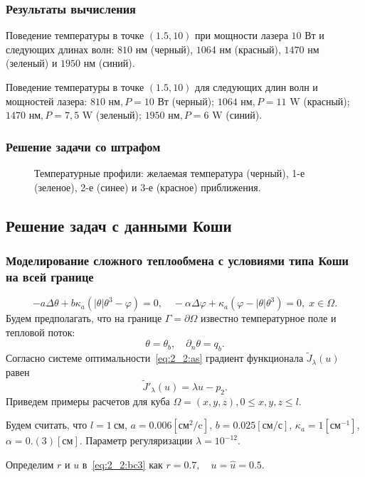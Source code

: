 \begin{frame}
    \frametitle{Результаты вычисления}
    \begin{minipage}[t]{0.47\linewidth}
        \small{Поведение температуры в точке $(1.5,10)$
            при мощности лазера $10\text{~Вт}$ и следующих длинах волн:
            $810\text{~нм}$ (черный), $1064\text{~нм}$ (красный),
            $1470\text{~нм}$ (зеленый) и $1950\text{~нм}$ (синий).}
    \end{minipage}
    \hfill
    \begin{minipage}[t]{0.47\linewidth}
        \small{Поведение температуры в точке $(1.5,10)$
            для следующих длин волн и мощностей лазера:
            $810 \text{~нм}, P=10 \text{~Вт}$ (черный);
            $1064 \text{~нм}, P=11 \text{~W}$ (красный);
            $1470 \text{~нм}, P=7,5 \text{~W}$ (зеленый);
            $1950 \text{~нм}, P=6 \text{~W}$ (синий).}
    \end{minipage}
\end{frame}

\begin{frame}
    \frametitle{Решение задачи со штрафом}
    \begin{figure}[h!t]
        \caption{Температурные профили: желаемая температура (черный),
            1-е (зеленое), 2-е (синее) и 3-е (красное) приближения.}
        \label{fig:4_3:7}
    \end{figure}
\end{frame}

\subsection{Решение задач с данными Коши}\label{subsec:koshi}
\begin{frame}
    \frametitle{Моделирование сложного теплообмена
    с условиями типа Коши на всей границе}
    \[
        - a\Delta\theta + b\kappa_a(|\theta|\theta^3- \varphi)=0,
        \quad -\alpha \Delta \varphi
        + \kappa_a(\varphi-|\theta|\theta^3)=0,\; x\in\Omega.
    \]
    Будем предполагать, что на границе $\Gamma = \partial \Omega$ известно
    температурное поле и тепловой поток:
    \[
        \theta = \theta_b,\quad \partial_n\theta = q_b.
    \]
    Согласно системе оптимальности~\eqref{eq:2_2:as} градиент функционала $\tilde J_\lambda(u)$ равен
    \[
        \tilde J'_\lambda (u) = \lambda u - p_2.
    \]
    Приведем примеры расчетов для куба $\Omega = {(x, y, z), 0 \leq x,y,z \leq l}$.

    Будем считать, что $l=1~\text{см}$, $a = 0.006[\text{см}^2/\text{c}]$,
    $b=0.025[\text{см}/\text{с}]$, $\kappa_a=1[\text{см}^{-1}]$, $\alpha = 0.(3)[\text{см}]$.
    Параметр регуляризации $\lambda=10^{-12}$.

    Определим $r$ и $u$ в~\eqref{eq:2_2:bc3} как $r = 0.7, \quad u = \hat u = 0.5$.
\end{frame}

